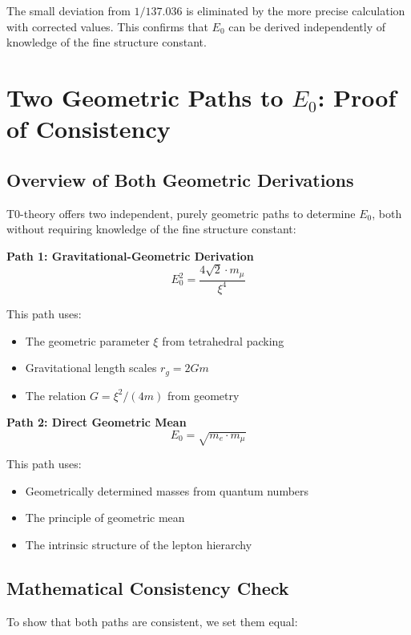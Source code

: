 \documentclass[12pt,a4paper]{report}
\begin{document}
	The small deviation from $1/137.036$ is eliminated by the more precise calculation with corrected values. This confirms that $E_0$ can be derived independently of knowledge of the fine structure constant.
	
	\section{Two Geometric Paths to $E_0$: Proof of Consistency}
	
	\subsection{Overview of Both Geometric Derivations}
	
	T0-theory offers two independent, purely geometric paths to determine $E_0$, both without requiring knowledge of the fine structure constant:
	
	\textbf{Path 1: Gravitational-Geometric Derivation}
	\begin{equation}
		E_0^2 = \frac{4\sqrt{2} \cdot m_\mu}{\xi^4}
	\end{equation}
	
	This path uses:
	\begin{itemize}
		\item The geometric parameter $\xi$ from tetrahedral packing
		\item Gravitational length scales $r_g = 2Gm$
		\item The relation $G = \xi^2/(4m)$ from geometry
	\end{itemize}
	
	\textbf{Path 2: Direct Geometric Mean}
	\begin{equation}
		E_0 = \sqrt{m_e \cdot m_\mu}
	\end{equation}
	
	This path uses:
	\begin{itemize}
		\item Geometrically determined masses from quantum numbers
		\item The principle of geometric mean
		\item The intrinsic structure of the lepton hierarchy
	\end{itemize}
	
	\subsection{Mathematical Consistency Check}
	
	To show that both paths are consistent, we set them equal:
	
\end{document}
